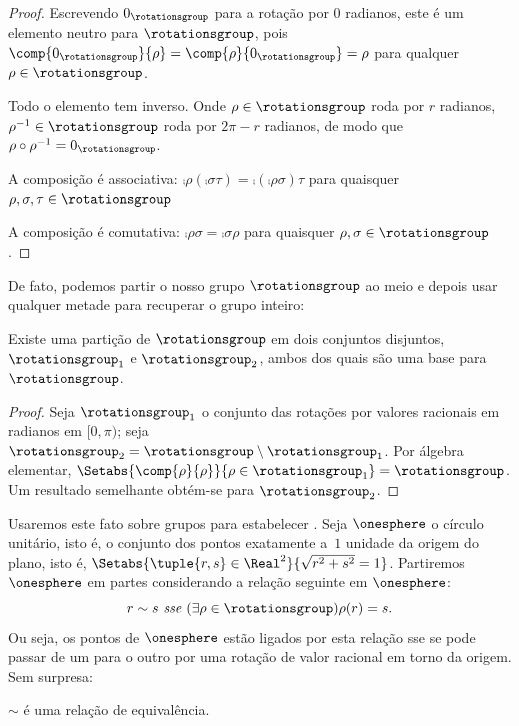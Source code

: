 \documentclass[../../../include/open-logic-section]{subfiles}
\begin{document}
\begin{proof}
Escrevendo $0_{\rotationsgroup}$ para a rotação por $0$ radianos, este é
um elemento neutro para $\rotationsgroup$, pois
$\comp{0_{\rotationsgroup}}{\rho} = \comp{\rho}{0_{\rotationsgroup}} =
\rho$ para qualquer $\rho \in \rotationsgroup$.

Todo o elemento tem inverso. Onde $\rho \in \rotationsgroup$ roda
por $r$ radianos, $\rho^{-1} \in \rotationsgroup$ roda por $2\pi - r$
radianos, de modo que $\rho \circ \rho^{-1} = 0_\rotationsgroup$.

A composição é associativa: $\comp{\rho}{(\comp{\sigma}{\tau})} =
\comp{(\comp{\rho}{\sigma})}{\tau}$ para quaisquer $\rho, \sigma, \tau \in
\rotationsgroup$

A composição é comutativa: $\comp{\rho}{\sigma} =
\comp{\sigma}{\rho}$ para quaisquer $\rho, \sigma \in \rotationsgroup$.
\end{proof}

De fato, podemos partir o nosso grupo $\rotationsgroup$
ao meio e depois usar qualquer metade para recuperar o grupo inteiro:

\begin{lem}
Existe uma partição de $\rotationsgroup$ em dois conjuntos disjuntos,
$\rotationsgroup_{1}$ e $\rotationsgroup_{2}$, ambos dos quais são uma
base para $\rotationsgroup$. 
\end{lem}

\begin{proof}
Seja $\rotationsgroup_{1}$ o conjunto das rotações por valores racionais em radianos
em $[0, \pi)$; seja $\rotationsgroup_{2} = \rotationsgroup
\setminus \rotationsgroup_1$. Por álgebra elementar,
$\Setabs{\comp{\rho}{\rho}}{\rho \in \rotationsgroup_1} =
\rotationsgroup$. Um resultado semelhante obtém-se para
$\rotationsgroup_2$.
\end{proof}

Usaremos este fato sobre grupos para estabelecer .
Seja $\onesphere$ o círculo unitário, isto é, o conjunto dos pontos
exatamente a~$1$ unidade da origem do plano, isto é,
$\Setabs{\tuple{r,s} \in \Real^2}{\sqrt{r^2+s^2}=1}$. Partiremos
$\onesphere$ em partes considerando a relação seguinte em
$\onesphere$:
\[
	r \sim s \emph{ sse }(\exists \rho \in \rotationsgroup)\rho(r) = s.
\]
Ou seja, os pontos de $\onesphere$ estão ligados por esta relação sse se pode passar de um para o outro por uma rotação de valor racional em torno da origem. Sem surpresa:

\begin{lem}
$\sim$ é uma relação de equivalência.
\end{lem}
\end{document}
